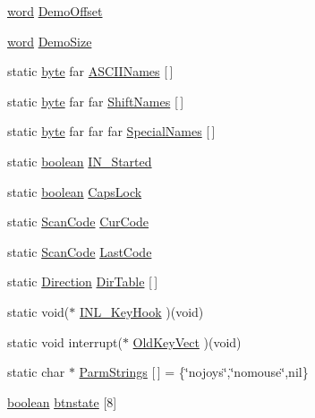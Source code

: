 \begin{DoxyCompactItemize}
\item 
\hyperlink{ID__HEAD_8H_abad51e07ab6d26bec9f1f786c8d65bcd}{word} \hyperlink{ID__IN_8C_a0e890514eba321a0ca518018964e3a63}{DemoOffset}
\item 
\hyperlink{ID__HEAD_8H_abad51e07ab6d26bec9f1f786c8d65bcd}{word} \hyperlink{ID__IN_8C_a8486d18dcabfa7a32dc114edc70ae0c6}{DemoSize}
\item 
static \hyperlink{ID__HEAD_8H_a0c8186d9b9b7880309c27230bbb5e69d}{byte} far \hyperlink{ID__IN_8C_a6c22c136da745810946d3aac69888876}{ASCIINames} \mbox{[}$\,$\mbox{]}
\item 
static \hyperlink{ID__HEAD_8H_a0c8186d9b9b7880309c27230bbb5e69d}{byte} far far \hyperlink{ID__IN_8C_a4d858fb984d609257e6e47a223306e3e}{ShiftNames} \mbox{[}$\,$\mbox{]}
\item 
static \hyperlink{ID__HEAD_8H_a0c8186d9b9b7880309c27230bbb5e69d}{byte} far far far \hyperlink{ID__IN_8C_abee0a5fc3b528833c6dfd04fd913a3ab}{SpecialNames} \mbox{[}$\,$\mbox{]}
\item 
static \hyperlink{ID__HEAD_8H_a7c6368b321bd9acd0149b030bb8275ed}{boolean} \hyperlink{ID__IN_8C_af28bee013911f8a1eec5bfd5367588cf}{IN\_\-Started}
\item 
static \hyperlink{ID__HEAD_8H_a7c6368b321bd9acd0149b030bb8275ed}{boolean} \hyperlink{ID__IN_8C_a5209de370ef200e743baca833db3ea30}{CapsLock}
\item 
static \hyperlink{ID__IN_8H_a92ee9291fc7e992c1662c4e195242f2d}{ScanCode} \hyperlink{ID__IN_8C_ad09634c37e6c87cf097abcbf08b9393f}{CurCode}
\item 
static \hyperlink{ID__IN_8H_a92ee9291fc7e992c1662c4e195242f2d}{ScanCode} \hyperlink{ID__IN_8C_a767f91c4e83781f8bea2b3e65e2fa142}{LastCode}
\item 
static \hyperlink{ID__IN_8H_a224b9163917ac32fc95a60d8c1eec3aa}{Direction} \hyperlink{ID__IN_8C_abe09b447128a6d0eabbcc212e97a0e8b}{DirTable} \mbox{[}$\,$\mbox{]}
\item 
static void($\ast$ \hyperlink{ID__IN_8C_aba302ab4ccb121b8b433e0072ab45fc9}{INL\_\-KeyHook} )(void)
\item 
static void interrupt($\ast$ \hyperlink{ID__IN_8C_ada5c331955ba1fc092fbf5ed7fb2f85f}{OldKeyVect} )(void)
\item 
static char $\ast$ \hyperlink{ID__IN_8C_af8599e1c1fbb3afabbdaa22e7c4a94b0}{ParmStrings} \mbox{[}$\,$\mbox{]} = \{\char`\"{}nojoys\char`\"{},\char`\"{}nomouse\char`\"{},nil\}
\item 
\hyperlink{ID__HEAD_8H_a7c6368b321bd9acd0149b030bb8275ed}{boolean} \hyperlink{ID__IN_8C_aa849c3f42c509da54c3639fc864af75c}{btnstate} \mbox{[}8\mbox{]}
\end{DoxyCompactItemize}


